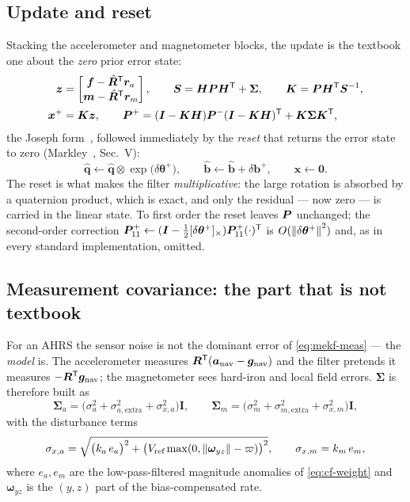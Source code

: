 \subsection{Update and reset}\label{sec:mekf-reset}
Stacking the accelerometer and magnetometer blocks, the update is the textbook one about the
\emph{zero} prior error state:
\begin{align}
\bm{z} &= \begin{bmatrix}\bm{f}-\hat{\bm{R}}^{\mathsf{T}}\bm{r}_a\\ \bm{m}-\hat{\bm{R}}^{\mathsf{T}}\bm{r}_m\end{bmatrix},
\qquad
\bm{S} = \bm{H}\bm{P}\bm{H}^{\mathsf{T}}+\bm{\Sigma},\qquad \bm{K}=\bm{P}\bm{H}^{\mathsf{T}}\bm{S}^{-1},\label{eq:mekf-K}\\
\bm{x}^+ &= \bm{K}\bm{z},\qquad
\bm{P}^{+} = (\bm{I}-\bm{K}\bm{H})\bm{P}^{-}(\bm{I}-\bm{K}\bm{H})^{\mathsf{T}} + \bm{K}\bm{\Sigma}\bm{K}^{\mathsf{T}} ,\label{eq:mekf-P}
\end{align}
the Joseph form~\cite{bucyjoseph1968}, followed immediately by the \emph{reset} that returns the
error state to zero (Markley~\cite{markley2003mekf}, Sec.~V):
\begin{equation}
\hat{\bm{q}} \leftarrow \hat{\bm{q}}\otimes\exp\!\big(\delta\bm{\theta}^+\big),\qquad
\hat{\bm{b}} \leftarrow \hat{\bm{b}} + \delta\bm{b}^+,\qquad
\bm{x}\leftarrow\bm{0} .
\label{eq:mekf-reset}
\end{equation}
The reset is what makes the filter \emph{multiplicative}: the large rotation is absorbed by a
quaternion product, which is exact, and only the residual --- now zero --- is carried in the linear
state. To first order the reset leaves $\bm{P}$ unchanged; the second-order correction
$\bm{P}^{+}_{11}\leftarrow(\bm{I}-\tfrac12[\delta\bm{\theta}^+]_\times)\bm{P}^{+}_{11}(\cdot)^{\mathsf{T}}$ is
$O(\left\lVert \delta\bm{\theta}^+ \right\rVert^2)$ and, as in every standard implementation, omitted.

\subsection{Measurement covariance: the part that is not textbook}
\label{sec:mekf-R}
For an AHRS the sensor noise is not the dominant error of \eqref{eq:mekf-meas} --- the \emph{model}
is. The accelerometer measures $\bm{R}^{\mathsf{T}}(\bm{a}_{\text{nav}}-\bm{g}_{\text{nav}})$ and the filter
pretends it measures $-\bm{R}^{\mathsf{T}}\bm{g}_{\text{nav}}$; the magnetometer sees hard-iron and local
field errors. $\bm{\Sigma}$ is therefore built as
\begin{equation}
\bm{\Sigma}_a = \big(\sigma_a^2+\sigma_{a,\text{extra}}^2+\sigma_{x,a}^2\big)\bm{I},\qquad
\bm{\Sigma}_m = \big(\sigma_m^2+\sigma_{m,\text{extra}}^2+\sigma_{x,m}^2\big)\bm{I},
\label{eq:mekf-R}
\end{equation}
with the disturbance terms
\begin{equation}
\sigma_{x,a} = \sqrt{\big(k_a\,e_a\big)^2 + \big(V_{\text{ref}}\max(0,\left\lVert \bm{\omega}_{yz} \right\rVert-\varpi)\big)^2},
\qquad
\sigma_{x,m} = k_m\,e_m ,
\label{eq:mekf-sx}
\end{equation}
where $e_a,e_m$ are the low-pass-filtered magnitude anomalies of \eqref{eq:cf-weight} and
$\bm{\omega}_{yz}$ is the $(y,z)$ part of the bias-compensated rate.

